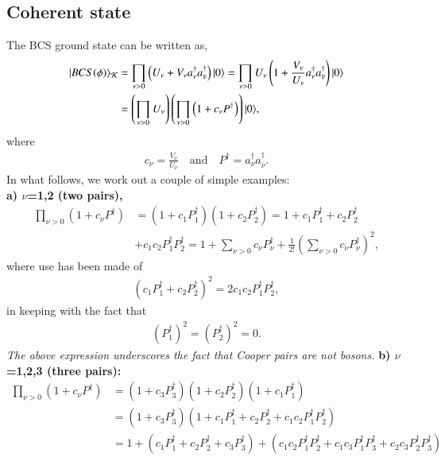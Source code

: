 \begin{subappendices} 
\section[Coherent state]{Coherent state}\label{App3E}
The BCS ground state can be written as,
\begin{align}\label{eq1App3Ex} 
\nonumber |{BCS(\phi)} \rangle_{\mathcal K}&=\prod_{\nu>0}\left(U_\nu+V_\nu a_\nu^\dagger a_{\bar{\nu}}^\dagger\right)|{0} \rangle=\prod_{\nu>0}U_\nu\left(1+\frac{V_\nu}{U_\nu} a_\nu^\dagger a_{\bar{\nu}}^\dagger\right)|{0} \rangle\\
&=\left(\prod_{\nu>0}U_\nu\right)\left(\prod_{\nu>0}\left(1+c_\nu P^\dagger\right)\right)|{0} \rangle,
\end{align}
where
\begin{align}\label{eq2App3Ex} 
 c_\nu=\frac{V_\nu}{U_\nu}\quad\text{and}\quad P^\dagger=a_\nu^\dagger a_{\bar{\nu}}^\dagger.
\end{align}
In what follows, we work out a couple of simple examples:\\
\textbf{a) $\nu$=1,2 (two pairs),}
\begin{align}\label{eq2App4Ex} 
 \nonumber \prod_{\nu>0}\left(1+c_\nu P^\dagger\right)&=\left(1+c_1P_1^\dagger\right)\left(1+c_2P_2^\dagger\right)=1+c_1P_1^\dagger+c_2P_2^\dagger\\
 &+c_1c_2P_1^\dagger P_2^\dagger=1+\sum_{\nu>0}c_\nu P_\nu^\dagger + \frac{1}{2!}\left(\sum_{\nu>0}c_\nu P^\dagger_\nu\right)^2,
\end{align}
where use has been made of
\begin{align}\label{eq2App5Ex} 
\left(c_1P_1^\dagger+ c_2P_2^\dagger\right)^2=2c_1c_2P_1^\dagger P_2^\dagger,
\end{align}
in keeping with  the fact that
\begin{align}\label{eq2App6Ex}
\left(P_1^\dagger\right)^2=\left(P_2^\dagger\right)^2=0.
\end{align}
\textit{The above expression underscores the fact that Cooper pairs are not bosons.}
\textbf{b) $\nu$=1,2,3 (three pairs):}
\begin{align}\label{eq2App7Ex}
\nonumber \prod_{\nu>0}\left(1+c_\nu P^\dagger\right)&=\left(1+c_3P_3^\dagger\right)\left(1+c_2P_2^\dagger\right)\left(1+c_1P_1^\dagger\right)\\
\nonumber &=\left(1+c_3P_3^\dagger\right)\left(1+c_1P_1^\dagger+c_2P_2^\dagger+c_1c_2P_1^\dagger P_2^\dagger\right)\\
\nonumber&=1+\left(c_1P_1^\dagger+c_2P_2^\dagger+c_3P_3^\dagger\right)+\left(c_1c_2P_1^\dagger P_2^\dagger+c_1c_3P_1^\dagger P_3^\dagger+c_2c_3P_2^\dagger P_3^\dagger\right)\\

\end{align}
\end{subappendices}
